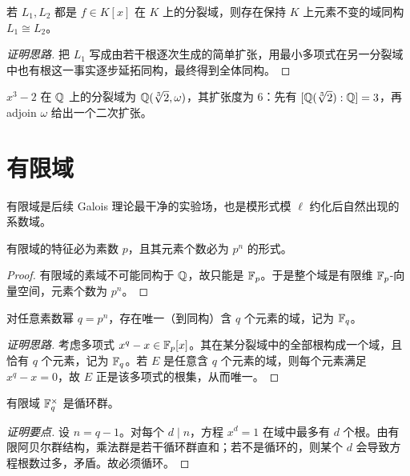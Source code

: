 \begin{theorem}[唯一性到同构]
若 $L_1,L_2$ 都是 $f\in K[x]$ 在 $K$ 上的分裂域，则存在保持 $K$ 上元素不变的域同构 $L_1\cong L_2$。
\end{theorem}

\begin{proof}[证明思路]
把 $L_1$ 写成由若干根逐次生成的简单扩张，用最小多项式在另一分裂域中也有根这一事实逐步延拓同构，最终得到全体同构。
\end{proof}

\begin{example}
$x^3-2$ 在 $\mathbb{Q}$ 上的分裂域为 $\mathbb{Q}(\sqrt[3]{2},\omega)$，其扩张度为 $6$：先有 $[\mathbb{Q}(\sqrt[3]{2}):\mathbb{Q}]=3$，再 adjoin $\omega$ 给出一个二次扩张。
\end{example}

\section{有限域}

有限域是后续 Galois 理论最干净的实验场，也是模形式模 $\ell$ 约化后自然出现的系数域。

\begin{theorem}
有限域的特征必为素数 $p$，且其元素个数必为 $p^n$ 的形式。
\end{theorem}

\begin{proof}
有限域的素域不可能同构于 $\mathbb{Q}$，故只能是 $\mathbb{F}_p$。于是整个域是有限维 $\mathbb{F}_p$-向量空间，元素个数为 $p^n$。
\end{proof}

\begin{theorem}[有限域的存在与唯一性]
对任意素数幂 $q=p^n$，存在唯一（到同构）含 $q$ 个元素的域，记为 $\mathbb{F}_q$。
\end{theorem}

\begin{proof}[证明思路]
考虑多项式 $x^{q}-x\in \mathbb{F}_p[x]$。其在某分裂域中的全部根构成一个域，且恰有 $q$ 个元素，记为 $\mathbb{F}_q$。若 $E$ 是任意含 $q$ 个元素的域，则每个元素满足 $x^q-x=0$，故 $E$ 正是该多项式的根集，从而唯一。
\end{proof}

\begin{theorem}
有限域 $\mathbb{F}_q^\times$ 是循环群。
\end{theorem}

\begin{proof}[证明要点]
设 $n=q-1$。对每个 $d\mid n$，方程 $x^d=1$ 在域中最多有 $d$ 个根。由有限阿贝尔群结构，乘法群是若干循环群直和；若不是循环的，则某个 $d$ 会导致方程根数过多，矛盾。故必须循环。
\end{proof}

